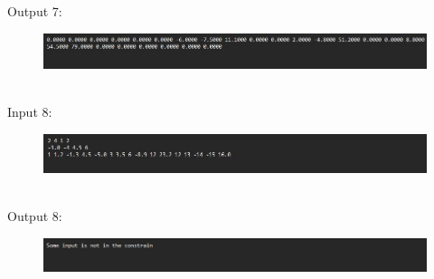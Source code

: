 \documentclass[a4paper]{article}
\begin{document}
\pagebreak
Output 7:
\begin{figure}[!h]
	\centering
	\includegraphics[scale=0.5]{Images/o7.jpg}
	\end{figure}\\
Input 8:
\begin{figure}[!h]
	\centering
	\includegraphics[scale=0.5]{Images/i8.jpg}
	\end{figure}\\
Output 8:
\begin{figure}[!h]
	\centering
	\includegraphics[scale=0.5]{Images/o8.jpg}
	\end{figure}\\
\end{document}
